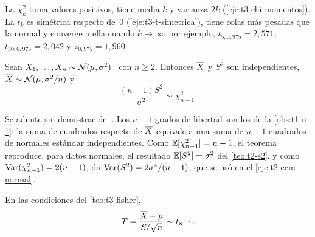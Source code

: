 La $\chi^{2}_k$ toma valores positivos, tiene media $k$ y varianza $2k$ (\cref{eje:t3-chi-momentos}). La $t_k$ es simétrica respecto de~$0$ (\cref{eje:t3-t-simetrica}), tiene colas más pesadas que la normal y converge a ella cuando $k\to\infty$: por ejemplo, $t_{5;0{,}975}=2{,}571$, $t_{30;0{,}975}=2{,}042$ y $z_{0{,}975}=1{,}960$.

\begin{teorema}\label{teo:t3-fisher}
Sean $X_1,\dots,X_n\sim\mathcal{N}(\mu,\sigma^{2})$ \iid\ con $n\ge2$. Entonces $\overline{X}$ y $S^{2}$ son independientes, $\overline{X}\sim\mathcal{N}(\mu,\sigma^{2}/n)$ y
\[
\frac{(n-1)S^{2}}{\sigma^{2}}\sim\chi^{2}_{n-1}.
\]
\end{teorema}

Se admite sin demostración~\cite[§10.4]{bh}. Los $n-1$ grados de libertad son los de la \cref{obs:t1-n-1}: la suma de cuadrados respecto de $\overline{X}$ equivale a una suma de $n-1$ cuadrados de normales estándar independientes. Como $\mathbb{E}[\chi^{2}_{n-1}]=n-1$, el teorema reproduce, para datos normales, el resultado $\mathbb{E}[S^{2}]=\sigma^{2}$ del \cref{teo:t2-s2}, y como $\operatorname{Var}(\chi^{2}_{n-1})=2(n-1)$, da $\operatorname{Var}(S^{2})=2\sigma^{4}/(n-1)$, que se usó en el \cref{eje:t2-ecm-normal}.

\begin{corolario}[Estadístico $t$]\label{cor:t3-t}
En las condiciones del \cref{teo:t3-fisher},
\[
T=\frac{\overline{X}-\mu}{S/\sqrt n}\sim t_{n-1}.
\]
\end{corolario}

\addtocounter{definicion}{1}%

\addtocounter{definicion}{1}%

